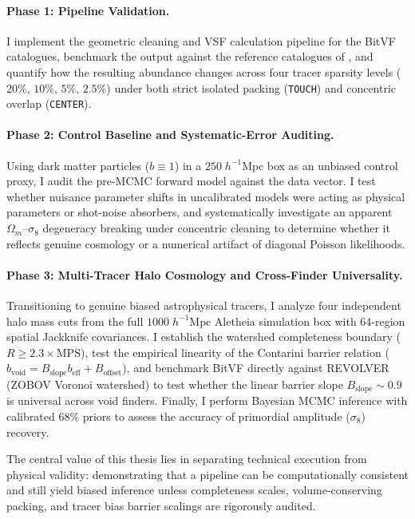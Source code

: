 \documentclass[12pt]{report}
\begin{document}
\paragraph{Phase 1: Pipeline Validation.} I implement the geometric cleaning and VSF calculation pipeline for the BitVF catalogues, benchmark the output against the reference catalogues of \citet{Sartori2025}, and quantify how the resulting abundance changes across four tracer sparsity levels ($20\%$, $10\%$, $5\%$, $2.5\%$) under both strict isolated packing (\texttt{TOUCH}) and concentric overlap (\texttt{CENTER}).

\paragraph{Phase 2: Control Baseline and Systematic-Error Auditing.} Using dark matter particles ($b \equiv 1$) in a $250\;h^{-1}\mathrm{Mpc}$ box as an unbiased control proxy, I audit the pre-MCMC forward model against the data vector. I test whether nuisance parameter shifts in uncalibrated models were acting as physical parameters or shot-noise absorbers, and systematically investigate an apparent $\Omega_m$--$\sigma_8$ degeneracy breaking under concentric cleaning to determine whether it reflects genuine cosmology or a numerical artifact of diagonal Poisson likelihoods.

\paragraph{Phase 3: Multi-Tracer Halo Cosmology and Cross-Finder Universality.} Transitioning to genuine biased astrophysical tracers, I analyze four independent halo mass cuts from the full $1000\;h^{-1}\mathrm{Mpc}$ Aletheia simulation box with 64-region spatial Jackknife covariances. I establish the watershed completeness boundary ($R \ge 2.3 \times \mathrm{MPS}$), test the empirical linearity of the Contarini barrier relation ($b_{\mathrm{void}} = B_{\mathrm{slope}} b_{\mathrm{eff}} + B_{\mathrm{offset}}$), and benchmark BitVF directly against REVOLVER (ZOBOV Voronoi watershed) to test whether the linear barrier slope $B_{\mathrm{slope}} \sim 0.9$ is universal across void finders. Finally, I perform Bayesian MCMC inference with calibrated 68\% priors to assess the accuracy of primordial amplitude ($\sigma_8$) recovery.

The central value of this thesis lies in separating technical execution from physical validity: demonstrating that a pipeline can be computationally consistent and still yield biased inference unless completeness scales, volume-conserving packing, and tracer bias barrier scalings are rigorously audited.
\end{document}
